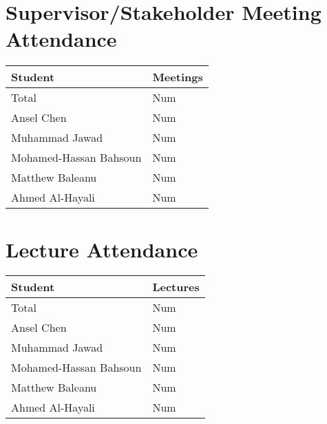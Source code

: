\documentclass{article}
\begin{document}

\section{Supervisor/Stakeholder Meeting Attendance}


\begin{table}[H]
\centering
\begin{tabular}{ll}
\toprule
\textbf{Student} & \textbf{Meetings}\\
\midrule
Total & Num\\
Ansel Chen & Num\\
Muhammad Jawad & Num\\
Mohamed-Hassan Bahsoun & Num\\
Matthew Baleanu & Num\\
Ahmed Al-Hayali & Num\\
\bottomrule
\end{tabular}
\end{table}


\section{Lecture Attendance}


\begin{table}[H]
\centering
\begin{tabular}{ll}
\toprule
\textbf{Student} & \textbf{Lectures}\\
\midrule
Total & Num\\
Ansel Chen & Num\\
Muhammad Jawad & Num\\
Mohamed-Hassan Bahsoun & Num\\
Matthew Baleanu & Num\\
Ahmed Al-Hayali & Num\\
\bottomrule
\end{tabular}
\end{table}
\end{document}
